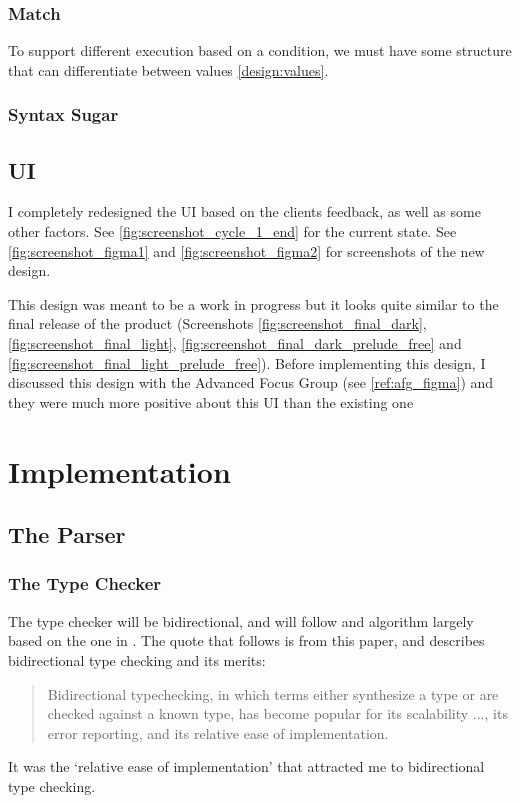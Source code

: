 \subsubsection{Match}
To support different execution based on a condition, we must have some structure that can differentiate between values \ref{design:values}. 

\subsubsection{Syntax Sugar}

\subsection{UI}
I completely redesigned the UI based on the clients feedback, as well as some other factors. See \ref{fig:screenshot_cycle_1_end} for the current state. See \ref{fig:screenshot_figma1} and \ref{fig:screenshot_figma2} for screenshots of the new design. 

This design was meant to be a work in progress but it looks quite similar to the final release of the product (Screenshots \ref{fig:screenshot_final_dark}, \ref{fig:screenshot_final_light}, \ref{fig:screenshot_final_dark_prelude_free} and \ref{fig:screenshot_final_light_prelude_free}). Before implementing this design, I discussed this design with the Advanced Focus Group (see \ref{ref:afg_figma}) and they were much more positive about this UI than the existing one 

\section{Implementation}
\subsection{The Parser}

\subsubsection{The Type Checker}
The type checker will be bidirectional, and will follow and algorithm largely based on the one in \cite{completebidir}. The quote that follows is from this paper, and describes bidirectional type checking and its merits:
\begin{quote}
Bidirectional typechecking, in which terms either synthesize a type or are checked against a known type, has become popular for its scalability ..., its error reporting, and its relative ease of implementation.
\end{quote}
\noindent It was the `relative ease of implementation' that attracted me to bidirectional type checking. 

